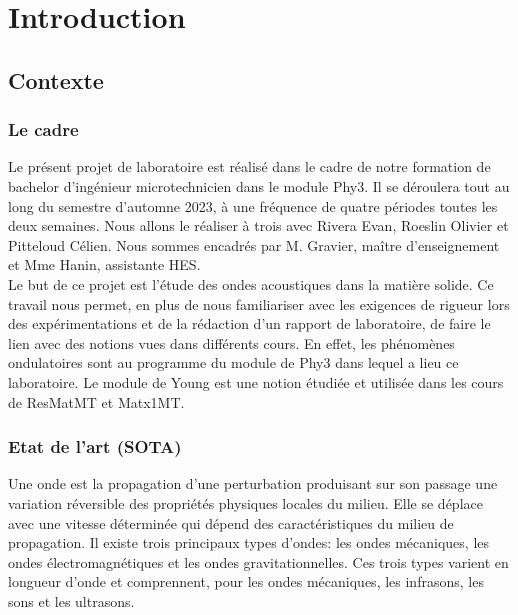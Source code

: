 \section{Introduction}
\subsection{Contexte}

\subsubsection{\large Le cadre}
Le présent projet de laboratoire est réalisé dans le cadre de notre 
formation de bachelor d'ingénieur microtechnicien dans le 
module Phy3. Il se déroulera tout au long du semestre d'automne 
2023, à une fréquence de quatre périodes toutes les deux semaines. Nous allons 
le réaliser à trois avec Rivera Evan, Roeslin Olivier et 
Pitteloud Célien. Nous sommes encadrés par M. Gravier, maître d'enseignement
et Mme Hanin, assistante HES.\\ 
Le but de ce projet est l'étude des ondes acoustiques dans la matière solide.
Ce travail nous permet, en plus de nous familiariser avec les exigences de rigueur 
lors des expérimentations et de la rédaction d'un rapport de laboratoire, de faire 
le lien avec des notions vues dans différents cours. En effet, les phénomènes
ondulatoires sont au programme du module de Phy3 dans lequel a lieu ce laboratoire.
Le module de Young est une notion étudiée et utilisée dans les cours de ResMatMT
et Matx1MT.

\subsubsection{\large Etat de l'art (SOTA)}
Une onde est la propagation d'une perturbation produisant sur son
passage une variation réversible des propriétés physiques locales 
du milieu. Elle se déplace avec une vitesse déterminée qui dépend 
des caractéristiques du milieu de propagation.
Il existe trois principaux types d'ondes: les ondes mécaniques, 
les ondes électromagnétiques et les ondes gravitationnelles.
Ces trois types varient en longueur d'onde et comprennent, 
pour les ondes mécaniques, les infrasons, 
les sons et les ultrasons.~\cite{wikipedia-onde}


